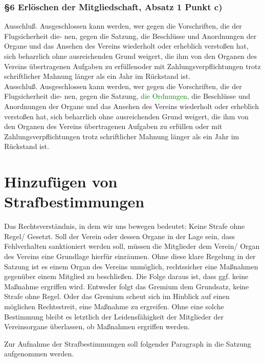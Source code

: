 \documentclass[10pt,a4paper,parskip=half]{scrartcl}
\newcommand{\new}[1]{\textcolor{Green}{#1}}
\newcommand{\change}[1]{
  \begin{adjustwidth}{20pt}{20pt}
    #1
  \end{adjustwidth}
}
\newcommand{\compare}[3]{\change{\subsubsection*{#1}\begin{multicols}{2}#2\columnbreak\\#3\end{multicols}}}
\begin{document}
\compare{§6 Erlöschen der Mitgliedschaft, Absatz 1 Punkt c)}
{Ausschluß. Ausgeschlossen kann werden, wer gegen die Vorschriften, die der Flugsicherheit die-
  nen, gegen die Satzung, die Beschlüsse und Anordnungen der Organe und das Ansehen des Vereins wiederholt oder erheblich verstoßen hat, sich beharrlich ohne ausreichenden Grund weigert, die ihm von den Organen des Vereins übertragenen Aufgaben zu erfüllenoder mit
  Zahlungsverpflichtungen trotz schriftlicher Mahnung länger als ein Jahr im Rückstand ist.}
{Ausschluß. Ausgeschlossen kann werden, wer gegen die Vorschriften, die der Flugsicherheit die-
  nen, gegen die Satzung, \new{die Ordnungen,} die Beschlüsse und Anordnungen der Organe und das
  Ansehen des Vereins wiederholt oder erheblich verstoßen hat, sich beharrlich ohne ausreichenden
  Grund weigert, die ihm von den Organen des Vereins übertragenen Aufgaben zu erfüllen oder mit
  Zahlungsverpflichtungen trotz schriftlicher Mahnung länger als ein Jahr im Rückstand ist.}

\clearpage
\section{Hinzufügen von Strafbestimmungen}
Das Rechtsverständnis, in dem wir uns bewegen bedeutet: Keine Strafe ohne Regel/ Gesetzt. Soll der Verein oder dessen Organe in der Lage sein, dass Fehlverhalten sanktioniert werden soll, müssen die Mitglieder dem Verein/ Organ des Vereins eine Grundlage hierfür einräumen. Ohne diese klare Regelung in der Satzung ist es einem Organ des Vereins unmöglich, rechtssicher eine Maßnahmen gegenüber einem Mitglied zu beschließen. Die Folge daraus ist, dass ggf. keine Maßnahme ergriffen wird. Entweder folgt das Gremium dem Grundsatz, keine Strafe ohne Regel. Oder das Gremium scheut sich im Hinblick auf einen möglichen Rechtsstreit, eine Maßnahme zu ergreifen. Ohne eine solche Bestimmung bleibt es letztlich der Leidensfähigkeit der Mitglieder der Vereinsorgane überlassen, ob Maßnahmen ergriffen werden.

Zur Aufnahme der Strafbestimmungen soll folgender Paragraph in die Satzung aufgenommen werden.
\end{document}
